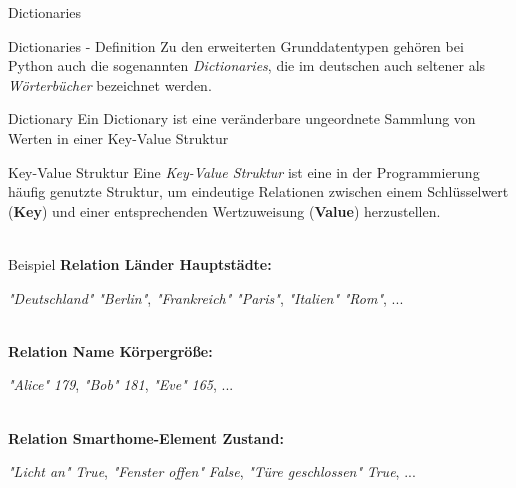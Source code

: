     \begin{subsection}{Dictionaries}
    
        \begin{frame}{Dictionaries - Definition}
            Zu den erweiterten Grunddatentypen gehören bei Python auch die sogenannten \textit{Dictionaries}, die im deutschen auch seltener als \textit{Wörterbücher} bezeichnet werden.
            
            \begin{block}{Dictionary}
                Ein Dictionary ist eine veränderbare ungeordnete Sammlung von Werten in einer Key-Value Struktur
            \end{block}
        \end{frame}
    
        \begin{frame}{Key-Value Struktur}
            Eine \textit{Key-Value Struktur} ist eine in der Programmierung häufig genutzte Struktur, um eindeutige Relationen zwischen einem Schlüsselwert (\textbf{Key}) und einer entsprechenden Wertzuweisung (\textbf{Value}) herzustellen. \\~\
            
            \begin{exampleblock}{Beispiel}
                \textbf{Relation Länder \textrightarrow Hauptstädte:}
                
                \textit{"Deutschland"} \textrightarrow \textit{"Berlin"}, \textit{"Frankreich"} \textrightarrow \textit{"Paris"}, \textit{"Italien"} \textrightarrow \textit{"Rom"}, ... \\~\
                
                \textbf{Relation Name \textrightarrow Körpergröße:}
                
                \textit{"Alice"} \textrightarrow \textit{179}, \textit{"Bob"} \textrightarrow \textit{181}, \textit{"Eve"} \textrightarrow \textit{165}, ...\\~\
                
                \textbf{Relation Smarthome-Element \textrightarrow Zustand:}
                
                \textit{"Licht an"} \textrightarrow \textit{True}, \textit{"Fenster offen"} \textrightarrow \textit{False}, \textit{"Türe geschlossen"} \textrightarrow \textit{True}, ...
                

            \end{exampleblock}
        \end{frame}
        

\end{subsection}
